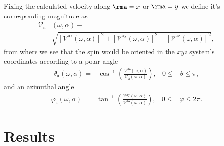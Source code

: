\documentclass[prb,11pt,tightenlines,twocolumn,aps]{revtex4-1}
\begin{document}
Fixing the calculated velocity along $\rma=x$ or $\rma=y$
 we define it's corresponding magnitude as
\begin{align}
\mathcal{V}_{\mathrm{a}}&(\omega,\alpha) \equiv \nonumber \\
&\sqrt { 
[\mathcal{V}^{\mathrm{ax}}(\omega,\alpha)]^{2} +
[\mathcal{V}^{\mathrm{ay}}(\omega,\alpha)]^{2} +
[\mathcal{V}^{\mathrm{az}}(\omega,\alpha)]^{2} 
},
\label{eq:vv-mag}
\end{align}
from where we see that the spin would be oriented
in the $xyz$ system's coordinates
according to a polar angle
\begin{align}
\theta_{\mathrm{a}}  (\omega,\alpha)
=& 
\cos^{-1} \left( \frac{\mathcal{V}^{\mathrm{az}}(\omega,\alpha)}
{\mathcal{V}_{\mathrm{a}}(\omega,\alpha)} \right),
& 0 \leq &\theta \leq \pi, 
\label{eq:polar-ang}
\end{align}
and an azimuthal angle
\begin{align}
\varphi_{\mathrm{a}} (\omega,\alpha)
=& 
\tan^{-1} \left( \frac{\mathcal{V}^{\mathrm{ay}}(\omega,\alpha)}
{\mathcal{V}^{\mathrm{ax}}(\omega,\alpha)} \right),
& 0 \leq &\varphi \leq 2\pi.
\label{eq:azimuthal-ang} 
\end{align} 



\section{Results} %
\label{sec:results}
\end{document}
